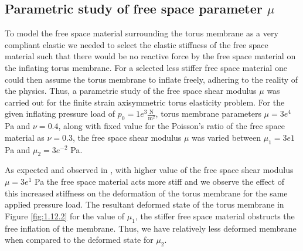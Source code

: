 \documentclass[11pt,a4paper,final]{article}
\begin{document}
\subsection{Parametric study of free space parameter $\mu$}
To model the free space material surrounding the torus membrane as a very compliant elastic we needed to select the elastic stiffness of the free space material such that there would be no reactive force by the free space material on the inflating torus membrane. For a selected less stiffer free space material one could then assume the torus membrane to inflate freely, adhering to the reality of the physics. Thus, a parametric study of the free space shear modulus $\mu$ was carried out for the finite strain axisymmetric torus elasticity problem. For the given inflating pressure load of $p_0 = 1e^{3} \frac{\text{N}}{\text{m}^2}$, torus membrane parameters $\mu = 3e^4$ Pa and $\nu = 0.4$, along with fixed value for the Poisson's ratio of the free space material as $\nu = 0.3$, the free space shear modulus $\mu$ was varied between $\mu_1 = 3e1$ Pa and $\mu_2 = 3e^{-2}$ Pa. \par 

As expected and observed in , with higher value of the free space shear modulus $\mu = 3e^{1}$ Pa the free space material acts more stiff and we observe the effect of this increased stiffness on the deformation of the torus membrane for the same applied pressure load. The resultant deformed state of the torus membrane in Figure \eqref{fig:1.12.2} for the value of $\mu_1$, the stiffer free space material obstructs the free inflation of the membrane. Thus, we have relatively less deformed membrane when compared to the deformed state for $\mu_2$. \par 
\end{document}
